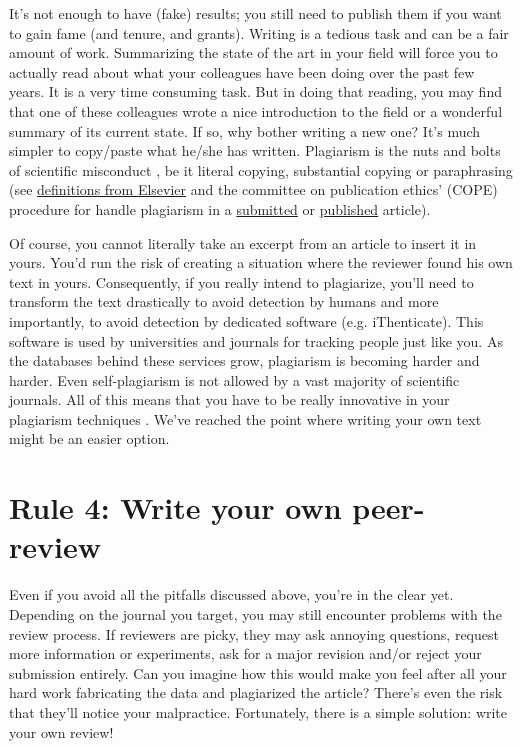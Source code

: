 \documentclass[a4paper,10pt,onecolumn]{article}
\begin{document}
It's not enough to have (fake) results; you still need to publish them if you want to gain fame (and tenure, and grants). Writing is a tedious task
and can be a fair amount of work. Summarizing the state of the art in your
field will force you to actually read about what your colleagues have been doing
over the past few years. It is a very time consuming task. But in doing that reading, you may find that one of these
colleagues wrote a nice introduction to the field or a wonderful summary of its current state. If so, why bother writing a new one? It's much simpler to copy/paste what he/she has written.  Plagiarism is the nuts and bolts of scientific misconduct
\citep{neuroskeptic:2017}, be it literal copying, substantial copying or
paraphrasing (see
\href{https://www.elsevier.com/editors/perk/plagiarism-complaints}{definitions
  from Elsevier} and the committee on publication ethics' (COPE) procedure for
handle plagiarism in a
\href{https://www.elsevier.com/__data/assets/pdf_file/0005/72815/plagiarism-A.pdf}{submitted}
or
\href{https://www.elsevier.com/__data/assets/pdf_file/0020/72830/plagiarism-B_0.pdf}{published}
article). 

Of course, you cannot literally take an excerpt from an
article to insert it in yours. You'd run the risk of creating a situation where the reviewer found his own text in yours. Consequently, if you
really intend to plagiarize, you'll need to transform the text drastically to
avoid detection by humans \citep{dorigo:2015,} and more importantly, to avoid
detection by dedicated software (e.g. iThenticate). This software is used by
universities and journals for tracking people just like you. As the databases behind these services grow, plagiarism is becoming harder and harder. Even
self-plagiarism is not allowed by a vast majority of scientific journals. All of this means that you have to be really innovative in your plagiarism techniques \citep{long:2009}. We've reached the point where writing your own text might be an easier option.

\section*{Rule 4: Write your own peer-review}

Even if you avoid all the pitfalls discussed above, you're in the clear yet. Depending on the
journal you target, you may still encounter problems with the review
process. If reviewers are picky, they may ask annoying questions,
request more information or experiments, ask for a major revision and/or reject your submission entirely. Can you imagine how this would make you feel after all your hard work
fabricating the data and plagiarized the article? There's even the risk that they'll notice your malpractice. Fortunately, there is a simple solution: write your
own review! 
\end{document}
